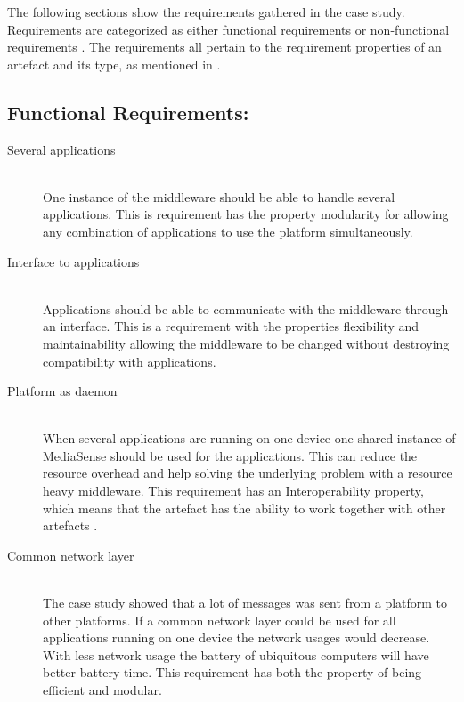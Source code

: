 
The following sections show the requirements gathered in the case study. Requirements are categorized as either functional requirements or non-functional requirements \cite{Roman1985}. The requirements all pertain to the requirement properties of an artefact and its type, as mentioned in \cite{johannesson2012design}. 

\subsection{Functional Requirements:}
\begin{description}
	\item[Several applications] \hfill \\
	One instance of the middleware should be able to handle several applications.
	This is requirement has the property modularity for allowing any combination of applications to use the platform simultaneously.
		
	
	\item[Interface to applications] \hfill \\
	Applications should be able to communicate with the middleware through an interface.
	This is a requirement with the properties flexibility and maintainability allowing the middleware to be changed without destroying compatibility with applications.
	
	\item[Platform as daemon] \hfill \\
	When several applications are running on one device one shared instance of MediaSense should be used for the applications. This can reduce the resource overhead and help solving the underlying problem with a resource heavy middleware. This requirement has an Interoperability property, which means that the artefact has the ability to work together with other artefacts \cite{johannesson2012design}. 
	
	\item[Common network layer] \hfill \\
	The case study showed that a lot of messages was sent from a platform to other platforms. If a common network layer could be used for all applications running on one device the network usages would decrease. With less network usage the battery of ubiquitous computers will have better battery time. This requirement has both the property of being efficient and modular. 
	

\end{description}
